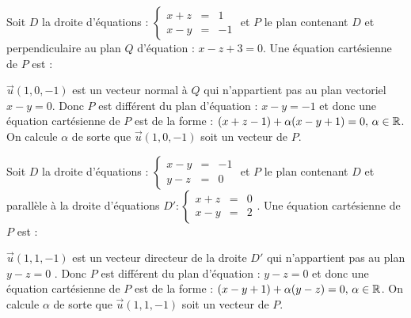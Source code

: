  \begin{question} 

Soit $D$ la droite d'équations :  $ \left\{\begin{array}{ccl}x+z&=&1\\x-y&=&-1 \end{array}\right.$ et $P$ le plan contenant $D$ et perpendiculaire au plan $Q$ d'équation : $x-z+3=0$.  Une équation cartésienne de $P$ est : 
\begin{answers}

 
    
   
   
\end{answers}
\begin{explanations}
$\vec{u}(1,0,-1)$ est un vecteur normal à $ Q$ qui n'appartient pas au  plan vectoriel $x-y=0$. Donc $P$ est différent du plan d'équation : $x-y=-1$ et donc  une équation cartésienne de $P$ est  de la forme : $(x+z-1) + \alpha(x-y+1)=0, \, \alpha \in \mathbb{R}$. On calcule $\alpha$ de sorte que $\vec{u}(1,0,-1)$ soit un vecteur de  $P$.
\end{explanations}

\end{question}
 

\begin{question} 

Soit $D$ la droite d'équations :  $ \left\{\begin{array}{ccl}x-y&=&-1\\y-z&=&0 \end{array}\right.$ et $P$ le plan contenant $D$ et parallèle à la droite d'équations  $D' : \left\{\begin{array}{ccl}x+z&=&0\\x-y&=&2 \end{array}\right.$. 
 Une équation cartésienne de $P$ est :
\begin{answers}

 
    
   
   
\end{answers}
\begin{explanations}
$\vec{u}(1,1,-1)$ est un vecteur directeur de la droite $D'$ qui  n'appartient pas au  plan  $y-z=0$ .   Donc $P$ est différent du plan d'équation :  $y-z=0$ et donc une équation cartésienne de $P$ est  de la forme : $(x-y+1) + \alpha(y-z)=0, \, \alpha \in \mathbb{R}$. On calcule $\alpha$ de sorte que $\vec{u}(1,1,-1)$ soit un vecteur de  $P$.
\end{explanations}

\end{question}

